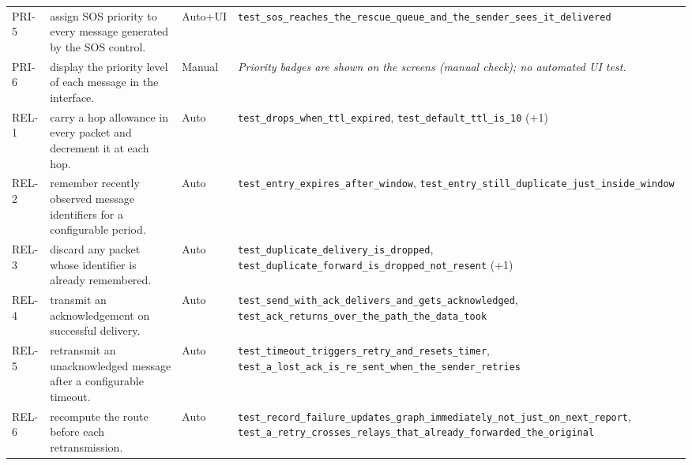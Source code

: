 \begin{longtable}{@{}p{0.95cm}p{6.6cm}p{1.15cm}p{8.6cm}@{}}
PRI-5 & assign SOS priority to every message generated by the SOS control. & Auto+UI & \texttt{test\_\allowbreak{}sos\_\allowbreak{}reaches\_\allowbreak{}the\_\allowbreak{}rescue\_\allowbreak{}queue\_\allowbreak{}and\_\allowbreak{}the\_\allowbreak{}sender\_\allowbreak{}sees\_\allowbreak{}it\_\allowbreak{}delivered} \\
PRI-6 & display the priority level of each message in the interface. & Manual & \textit{Priority badges are shown on the screens (manual check); no automated UI test.} \\
REL-1 & carry a hop allowance in every packet and decrement it at each hop. & Auto & \texttt{test\_\allowbreak{}drops\_\allowbreak{}when\_\allowbreak{}ttl\_\allowbreak{}expired}, \texttt{test\_\allowbreak{}default\_\allowbreak{}ttl\_\allowbreak{}is\_\allowbreak{}10} (+1) \\
REL-2 & remember recently observed message identifiers for a configurable period. & Auto & \texttt{test\_\allowbreak{}entry\_\allowbreak{}expires\_\allowbreak{}after\_\allowbreak{}window}, \texttt{test\_\allowbreak{}entry\_\allowbreak{}still\_\allowbreak{}duplicate\_\allowbreak{}just\_\allowbreak{}inside\_\allowbreak{}window} \\
REL-3 & discard any packet whose identifier is already remembered. & Auto & \texttt{test\_\allowbreak{}duplicate\_\allowbreak{}delivery\_\allowbreak{}is\_\allowbreak{}dropped}, \texttt{test\_\allowbreak{}duplicate\_\allowbreak{}forward\_\allowbreak{}is\_\allowbreak{}dropped\_\allowbreak{}not\_\allowbreak{}resent} (+1) \\
REL-4 & transmit an acknowledgement on successful delivery. & Auto & \texttt{test\_\allowbreak{}send\_\allowbreak{}with\_\allowbreak{}ack\_\allowbreak{}delivers\_\allowbreak{}and\_\allowbreak{}gets\_\allowbreak{}acknowledged}, \texttt{test\_\allowbreak{}ack\_\allowbreak{}returns\_\allowbreak{}over\_\allowbreak{}the\_\allowbreak{}path\_\allowbreak{}the\_\allowbreak{}data\_\allowbreak{}took} \\
REL-5 & retransmit an unacknowledged message after a configurable timeout. & Auto & \texttt{test\_\allowbreak{}timeout\_\allowbreak{}triggers\_\allowbreak{}retry\_\allowbreak{}and\_\allowbreak{}resets\_\allowbreak{}timer}, \texttt{test\_\allowbreak{}a\_\allowbreak{}lost\_\allowbreak{}ack\_\allowbreak{}is\_\allowbreak{}re\_\allowbreak{}sent\_\allowbreak{}when\_\allowbreak{}the\_\allowbreak{}sender\_\allowbreak{}retries} \\
REL-6 & recompute the route before each retransmission. & Auto & \texttt{test\_\allowbreak{}record\_\allowbreak{}failure\_\allowbreak{}updates\_\allowbreak{}graph\_\allowbreak{}immediately\_\allowbreak{}not\_\allowbreak{}just\_\allowbreak{}on\_\allowbreak{}next\_\allowbreak{}report}, \texttt{test\_\allowbreak{}a\_\allowbreak{}retry\_\allowbreak{}crosses\_\allowbreak{}relays\_\allowbreak{}that\_\allowbreak{}already\_\allowbreak{}forwarded\_\allowbreak{}the\_\allowbreak{}original} \\

\end{longtable}
